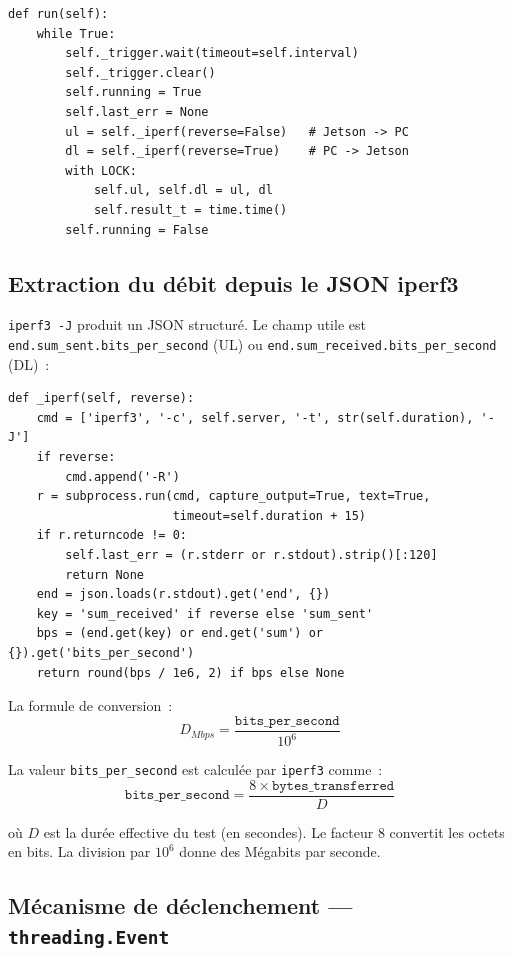 \documentclass[a4paper,12pt]{article}
\begin{document}
\begin{lstlisting}[caption={Exécution séquentielle UL puis DL}]
def run(self):
    while True:
        self._trigger.wait(timeout=self.interval)
        self._trigger.clear()
        self.running = True
        self.last_err = None
        ul = self._iperf(reverse=False)   # Jetson -> PC
        dl = self._iperf(reverse=True)    # PC -> Jetson
        with LOCK:
            self.ul, self.dl = ul, dl
            self.result_t = time.time()
        self.running = False
\end{lstlisting}

\subsection{Extraction du débit depuis le JSON iperf3}

\texttt{iperf3 -J} produit un JSON structuré. Le champ utile est
\texttt{end.sum\_sent.bits\_per\_second} (UL) ou \texttt{end.sum\_received.bits\_per\_second} (DL)~:

\begin{lstlisting}[caption={Parsing du JSON iperf3}]
def _iperf(self, reverse):
    cmd = ['iperf3', '-c', self.server, '-t', str(self.duration), '-J']
    if reverse:
        cmd.append('-R')
    r = subprocess.run(cmd, capture_output=True, text=True,
                       timeout=self.duration + 15)
    if r.returncode != 0:
        self.last_err = (r.stderr or r.stdout).strip()[:120]
        return None
    end = json.loads(r.stdout).get('end', {})
    key = 'sum_received' if reverse else 'sum_sent'
    bps = (end.get(key) or end.get('sum') or {}).get('bits_per_second')
    return round(bps / 1e6, 2) if bps else None
\end{lstlisting}

La formule de conversion~:
\begin{equation}
  \boxed{D_{Mbps} = \frac{\texttt{bits\_per\_second}}{10^6}}
\end{equation}

La valeur \texttt{bits\_per\_second} est calculée par \texttt{iperf3} comme~:
\begin{equation}
  \texttt{bits\_per\_second} = \frac{8 \times \texttt{bytes\_transferred}}{D}
\end{equation}

où $D$ est la durée effective du test (en secondes). Le facteur $8$ convertit les
octets en bits. La division par $10^6$ donne des Mégabits par seconde.

\subsection{Mécanisme de déclenchement — \texttt{threading.Event}}
\end{document}
